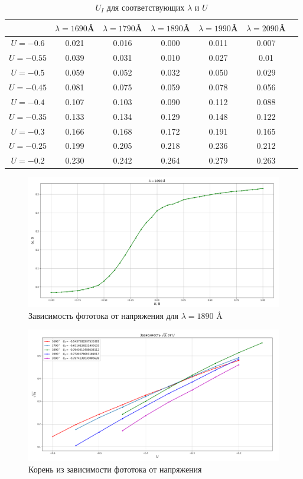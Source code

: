 \documentclass[a4paper,12pt]{article}
\theoremstyle{definition}
\begin{document}
	\begin{table}[h]
		\centering
		\caption{$U_I$ для соответствующих $\lambda$ и  $U$}
		\begin{tabular}{|c||c|c|c|c|c|c|} \hline
			 			& $\lambda = 1690$\AA & $\lambda = 1790$\AA & $\lambda = 1890$\AA & $\lambda = 1990$\AA & $\lambda = 2090$\AA \\ \hline \hline
			$U = -0.6$  & 0.021 & 0.016 & 0.000 & 0.011 & 0.007 \\ \hline
			$U = -0.55$ & 0.039 & 0.031 & 0.010 & 0.027 & 0.01  \\ \hline
			$U = -0.5$  & 0.059 & 0.052 & 0.032 & 0.050 & 0.029 \\ \hline
			$U = -0.45$ & 0.081 & 0.075 & 0.059 & 0.078 & 0.056 \\ \hline
			$U = -0.4$  & 0.107 & 0.103 & 0.090 & 0.112 & 0.088 \\ \hline
			$U = -0.35$ & 0.133 & 0.134 & 0.129 & 0.148 & 0.122 \\ \hline
			$U = -0.3$  & 0.166 & 0.168 & 0.172 & 0.191 & 0.165 \\ \hline
			$U = -0.25$ & 0.199 & 0.205 & 0.218 & 0.236 & 0.212 \\ \hline
			$U = -0.2$  & 0.230 & 0.242 & 0.264 & 0.279 & 0.263 \\ \hline
		\end{tabular}
	\end{table}

	\begin{figure}[H]
		\centering
		\includegraphics[width = \textwidth]{photoeffect.png}
		\caption{Зависимость фототока от напряжения для $\lambda = 1890$ \AA} 
	\end{figure}

	\begin{figure}[H]
		\centering
		\includegraphics[width = \textwidth]{all.png}
		\caption{Корень из зависимости фототока от напряжения} 
	\end{figure}
\end{document}

